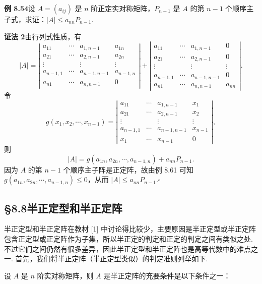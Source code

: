 \documentclass[UTF8,12pt,a4paper,fontset=fandol]{ctexart}
\begin{document}
\noindent\textbf{例 8.54}\quad 设 $A=(a_{ij})$ 是 $n$ 阶正定实对称矩阵，$P_{n-1}$ 是 $A$ 的第 $n-1$ 个顺序主子式，求证：$|A|\le a_{nn}P_{n-1}$.

\noindent\textbf{证法 2}\quad 由行列式性质，有
\[
|A|=
\left|\begin{array}{ccccc}
a_{11} & \cdots & a_{1,n-1} & a_{1n}\\
a_{21} & \cdots & a_{2,n-1} & a_{2n}\\
\vdots &        & \vdots & \vdots\\
a_{n-1,1} & \cdots & a_{n-1,n-1} & a_{n-1,n}\\
a_{n1} & \cdots & a_{n,n-1} & 0
\end{array}\right|
+
\left|\begin{array}{ccccc}
a_{11} & \cdots & a_{1,n-1} & 0\\
a_{21} & \cdots & a_{2,n-1} & 0\\
\vdots &        & \vdots & \vdots\\
a_{n-1,1} & \cdots & a_{n-1,n-1} & 0\\
a_{n1} & \cdots & a_{n,n-1} & a_{nn}
\end{array}\right|.
\]
令
\[
g(x_1,x_2,\cdots,x_{n-1})=
\left|\begin{array}{cccc}
a_{11} & \cdots & a_{1,n-1} & x_1\\
a_{21} & \cdots & a_{2,n-1} & x_2\\
\vdots &        & \vdots & \vdots\\
a_{n-1,1} & \cdots & a_{n-1,n-1} & x_{n-1}\\
x_1 & \cdots & x_{n-1} & 0
\end{array}\right|,
\]
则
\[
|A|=g(a_{1n},a_{2n},\cdots,a_{n-1,n})+a_{nn}P_{n-1}.
\]
因为 $A$ 的第 $n-1$ 个顺序主子阵是正定阵，故由例 8.61 可知 $g(a_{1n},a_{2n},\cdots,a_{n-1,n})\le 0$，从而 $|A|\le a_{nn}P_{n-1}. \ensuremath{\square}$

\subsection*{§8.8\quad 半正定型和半正定阵}

半正定型和半正定阵在教材 [1] 中讨论得比较少，主要原因是半正定型或半正定阵包含正定型或正定阵作为子集，所以半正定的判定和正定的判定之间有类似之处. 不过它们之间仍然有很多差异，因此半正定型和半正定阵也是高等代数中的难点之一. 首先，我们将半正定阵（半正定型类似）的判定准则列举如下.

设 $A$ 是 $n$ 阶实对称矩阵，则 $A$ 是半正定阵的充要条件是以下条件之一：
\end{document}
